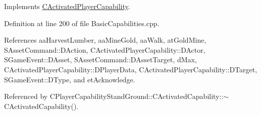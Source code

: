 Implements \hyperlink{classCActivatedPlayerCapability_a943b5999a57504399293250382c0ec6a}{C\+Activated\+Player\+Capability}.



Definition at line 200 of file Basic\+Capabilities.\+cpp.



References aa\+Harvest\+Lumber, aa\+Mine\+Gold, aa\+Walk, at\+Gold\+Mine, S\+Asset\+Command\+::\+D\+Action, C\+Activated\+Player\+Capability\+::\+D\+Actor, S\+Game\+Event\+::\+D\+Asset, S\+Asset\+Command\+::\+D\+Asset\+Target, d\+Max, C\+Activated\+Player\+Capability\+::\+D\+Player\+Data, C\+Activated\+Player\+Capability\+::\+D\+Target, S\+Game\+Event\+::\+D\+Type, and et\+Acknowledge.



Referenced by C\+Player\+Capability\+Stand\+Ground\+::\+C\+Activated\+Capability\+::$\sim$\+C\+Activated\+Capability().



